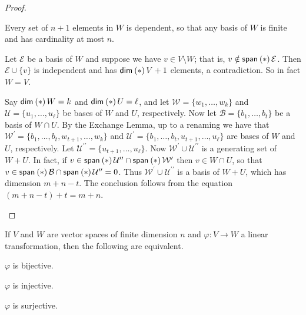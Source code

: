 \documentclass{memoir}
\begin{document}
\begin{proof} \mbox{}
\begin{enumerate*}
\item Every set of $n+1$ elements in $W$ is dependent, so that any basis of $W$ is finite and has cardinality at most $n$.
\item Let $\mathcal{E}$ be a basis of $W$ and suppose we have $v \in V \setminus W$; that is, $v \notin \operatorname{\mathsf{span}}_{}\left(*\right){\mathcal{E}}$. Then $\mathcal{E} \cup \{v\}$ is independent and has $\operatorname{\mathsf{dim}}_{}\left(*\right){V} + 1$ elements, a contradiction. So in fact $W = V$.
\item Say $\operatorname{\mathsf{dim}}_{}\left(*\right){W} = k$ and $\operatorname{\mathsf{dim}}_{}\left(*\right){U} = \ell$, and let $\mathcal{W} = \{w_1,\ldots,w_k\}$ and $\mathcal{U} = \{u_1,\ldots,u_\ell\}$ be bases of $W$ and $U$, respectively. Now let $\mathcal{B} = \{b_1,\ldots,b_t\}$ be a basis of $W \cap U$. By the Exchange Lemma, up to a renaming we have that $\mathcal{W}^\prime = \{b_1,\ldots,b_t,w_{t+1},\ldots,w_k\}$ and $\mathcal{U}^\prime = \{b_1,\ldots,b_t,u_{t+1},\ldots,u_\ell\}$ are bases of $W$ and $U$, respectively. Let $\mathcal{U}^{\prime\prime} = \{u_{t+1},\ldots,u_\ell\}$. Now $\mathcal{W}^\prime \cup \mathcal{U}^{\prime\prime}$ is a generating set of $W + U$. In fact, if $v \in \operatorname{\mathsf{span}}_{}\left(*\right){\mathcal{U}^{\prime\prime}} \cap \operatorname{\mathsf{span}}_{}\left(*\right){\mathcal{W}^\prime}$ then $v \in W \cap U$, so that $v \in \operatorname{\mathsf{span}}_{}\left(*\right){\mathcal{B}} \cap \operatorname{\mathsf{span}}_{}\left(*\right){\mathcal{U}^{\prime\prime}} = 0$. Thus $\mathcal{W}^\prime \cup \mathcal{U}^{\prime\prime}$ is a basis of $W+U$, which has dimension $m+n-t$. The conclusion follows from the equation $(m+n-t) + t = m+n$. \qedhere
\end{enumerate*}
\end{proof}

\begin{prp}
If $V$ and $W$ are vector spaces of finite dimension $n$ and $\varphi : V \rightarrow W$ a linear transformation, then the following are equivalent.
\begin{enumerate*}
\item $\varphi$ is bijective.
\item $\varphi$ is injective.
\item $\varphi$ is surjective.
\end{enumerate*}
\end{prp}
\end{document}

